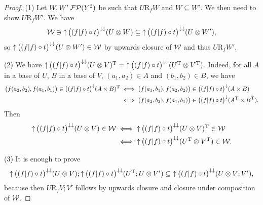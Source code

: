 \begin{proof}
(1) Let $W,W'\operatorname{\mathcal{FP}}(Y^2)$ be such that $U\mathrel{\mathrm{R}_{f}}W$ and $W\subseteq W'$. We then need to show $U\mathrel{\mathrm{R}_{f}}W'$. We have 
\[ \mathcal{W} \ni \operatorname{\uparrow}\big((f|f)\circ t \big)^{\downarrow\downarrow}(U\otimes W) \subseteq \operatorname{\uparrow}\big((f|f)\circ t \big)^{\downarrow\downarrow}(U\otimes W'), \]
so $\operatorname{\uparrow}\big((f|f)\circ t \big)^{\downarrow\downarrow}(U\otimes W') \in \mathcal{W}$ by upwards closure of $\mathcal{W}$ and thus $U\mathrel{\mathrm{R}_{f}}W'$.

(2) We have $\operatorname{\uparrow}\big((f|f)\circ t \big)^{\downarrow\downarrow}(U\otimes V)^{\mathrm{T}} = \operatorname{\uparrow}\big((f|f)\circ t \big)^{\downarrow\downarrow}(U^{\mathrm{T}}\otimes V^{\mathrm{T}})$. Indeed, for all $A$ in a base of $U$, $B$ in a base of $V$, $(a_1, a_2)\in A$ and $(b_1, b_2)\in B$, we have
\begin{align*}
\big(f(a_2, b_2), f(a_1, b_1)\big) \in \big((f|f)\circ t \big)^{\downarrow}(A\times B)^{\mathrm{T}} &\iff \big(f(a_1, b_1), f(a_2, b_2)\big) \in \big((f|f)\circ t \big)^{\downarrow}(A\times B) \\
&\iff \big(f(a_2, b_2), f(a_1, b_1)\big) \in \big((f|f)\circ t \big)^{\downarrow}(A^{\mathrm{T}}\times B^{\mathrm{T}}).
\end{align*}
Then
\begin{align*}
\operatorname{\uparrow}\big((f|f)\circ t \big)^{\downarrow\downarrow}(U\otimes V) \in \mathcal{W} &\iff \operatorname{\uparrow}\big((f|f)\circ t \big)^{\downarrow\downarrow}(U\otimes V)^{\mathrm{T}} \in \mathcal{W} \\
&\iff \operatorname{\uparrow}\big((f|f)\circ t \big)^{\downarrow\downarrow}(U^{\mathrm{T}}\otimes V^{\mathrm{T}}) \in \mathcal{W}.
\end{align*}

(3) It is enough to prove
\[ \operatorname{\uparrow}\big((f|f)\circ t \big)^{\downarrow\downarrow}(U\otimes V);\operatorname{\uparrow}\big((f|f)\circ t \big)^{\downarrow\downarrow}(U^{\mathrm{T}};U\otimes V') \subseteq \operatorname{\uparrow}\big((f|f)\circ t \big)^{\downarrow\downarrow}(U\otimes V;V'), \]
because then $U\mathrel{\mathrm{R}_{f}} V;V'$ follows by upwards closure and closure under composition of $\mathcal{W}$.


\end{proof}
